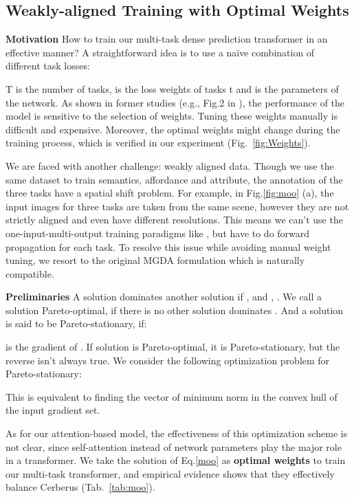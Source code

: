 \documentclass[10pt,twocolumn,letterpaper]{article}
\begin{document}
\subsection{Weakly-aligned Training with Optimal Weights}

\textbf{Motivation} How to train our multi-task dense prediction transformer in an effective manner? A straightforward idea is to use a naïve combination of different task losses:

T is the number of tasks,  is the loss weights of tasks t and  is the parameters of the network. As shown in former studies (e.g., Fig.2 in \cite{kendall2018multi}), the performance of the model is sensitive to the selection of weights. Tuning these weights manually is difficult and expensive. Moreover, the optimal weights might change during the training process, which is verified in our experiment (Fig.~\ref{fig:Weights}).

We are faced with another challenge: weakly aligned data. Though we use the same dataset to train semantics, affordance and attribute, the annotation of the three tasks have a spatial shift problem. For example, in Fig.\ref{fig:moo} (a), the input images for three tasks are taken from the same scene, however they are not strictly aligned and even have different resolutions. This means we can't use the one-input-multi-output training paradigms like \cite{sener2018multi}, but have to do forward propagation for each task. To resolve this issue while avoiding manual weight tuning, we resort to the original MGDA formulation \cite{desideri2012multiple} which is naturally compatible.



\textbf{Preliminaries} A solution  dominates another solution  if ,   and , . We call a solution  Pareto-optimal, if there is no other solution dominates  . And a solution  is said to be Pareto-stationary, if:

 is the gradient of . If solution  is Pareto-optimal, it is Pareto-stationary, but the reverse isn't always true\cite{desideri2012multiple}.  We consider the following optimization problem for Pareto-stationary:

This is equivalent to finding the vector of minimum norm in the convex hull of the input gradient set. 

As for our attention-based model, the effectiveness of this optimization scheme is not clear, since self-attention instead of network parameters play the major role in a transformer. We take the solution of Eq.\ref{moo} as \textbf{optimal weights} to train our multi-task transformer, and empirical evidence shows that they effectively balance Cerberus (Tab.~\ref{tab:moo}). 
\end{document}

